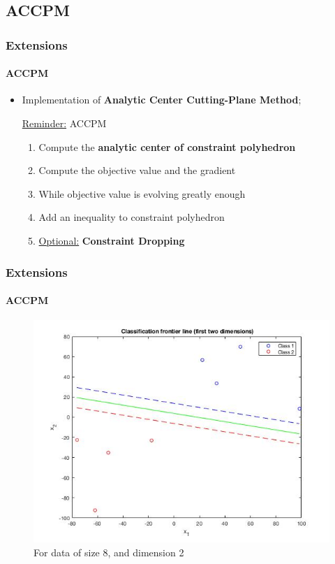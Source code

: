 \documentclass{beamer}
\begin{document}
\subsection{ACCPM}

\begin{frame}
\tableofcontents[currentsubsection]
\end{frame}

\begin{frame}
\frametitle{Extensions}
\framesubtitle{ACCPM}

\begin{itemize}

\item Implementation of \textbf{Analytic Center Cutting-Plane Method};

\bigskip
\pause

\begin{block}{\underline{Reminder:} ACCPM}
\begin{enumerate}
\item Compute the \textbf{analytic center of constraint polyhedron} 
\item Compute the objective value and the gradient 
\item While objective value is evolving greatly enough
\item Add an inequality to constraint polyhedron 
\item \underline{Optional:} \textbf{Constraint Dropping}
\end{enumerate}
\end{block}

\end{itemize}

\end{frame}

\begin{frame}
\frametitle{Extensions}
\framesubtitle{ACCPM}

\begin{figure}
\caption{For data of size 8, and dimension 2}
\includegraphics[scale=0.4]{images/accpmtestfig.jpg}
\end{figure}

\end{frame}
\end{document}
